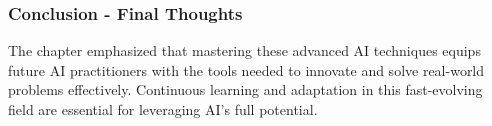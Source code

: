 \documentclass[aspectratio=169]{beamer}
\begin{document}
\begin{frame}[fragile]
    \frametitle{Conclusion - Final Thoughts}
    The chapter emphasized that mastering these advanced AI techniques equips future AI practitioners with the tools needed to innovate and solve real-world problems effectively. Continuous learning and adaptation in this fast-evolving field are essential for leveraging AI's full potential.
\end{frame}
\end{document}
